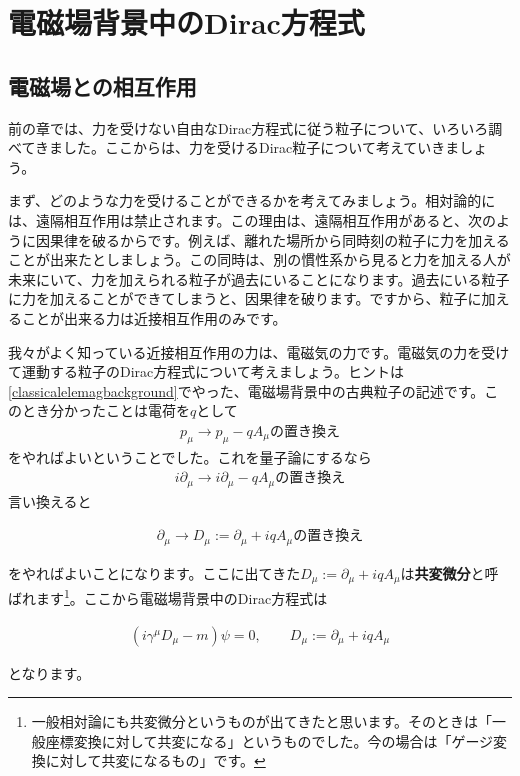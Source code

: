 \documentclass[report,paper=a4, fontsize=12pt, line_length=16cm, number_of_lines=33,dvipdfmx]{jlreq}
\newenvironment{important}{\begin{tcolorbox}[
  colback = white,
  colframe = red!35,
  boxrule = 2mm,
  fonttitle = \bfseries,
  after = \noindent] }{\end{tcolorbox}}
\numberwithin{equation}{chapter}
\newcommand{\del}{\partial}
\newcommand{\strong}[1]{{\sffamily \bfseries #1}}
\begin{document}
\chapter{電磁場背景中のDirac方程式}
\section{電磁場との相互作用}
前の章では、力を受けない自由なDirac方程式に従う粒子について、いろいろ調べてきました。ここからは、力を受けるDirac粒子について考えていきましょう。

まず、どのような力を受けることができるかを考えてみましょう。相対論的には、遠隔相互作用は禁止されます。この理由は、遠隔相互作用があると、次のように因果律を破るからです。例えば、離れた場所から同時刻の粒子に力を加えることが出来たとしましょう。この同時は、別の慣性系から見ると力を加える人が未来にいて、力を加えられる粒子が過去にいることになります。過去にいる粒子に力を加えることができてしまうと、因果律を破ります。ですから、粒子に加えることが出来る力は近接相互作用のみです。

我々がよく知っている近接相互作用の力は、電磁気の力です。電磁気の力を受けて運動する粒子のDirac方程式について考えましょう。ヒントは\ref{classicalelemagbackground}でやった、電磁場背景中の古典粒子の記述です。このとき分かったことは電荷を$q$として
\begin{align}
  p_{\mu}\rightarrow p_{\mu}-qA_{\mu}\text{の置き換え}
\end{align}
をやればよいということでした。これを量子論にするなら
\begin{align}
  i\del_{\mu}\rightarrow i\del_{\mu}-qA_{\mu}\text{の置き換え}
\end{align}
言い換えると
\begin{important}
  \begin{align}
    \del_{\mu}\rightarrow D_{\mu}:=\del_{\mu}+iqA_{\mu}\text{の置き換え}\label{covariantderivative}
  \end{align}
\end{important}
をやればよいことになります。ここに出てきた$D_{\mu}:=\del_{\mu}+iqA_{\mu}$は\strong{共変微分}と呼ばれます\footnote{一般相対論にも共変微分というものが出てきたと思います。そのときは「一般座標変換に対して共変になる」というものでした。今の場合は「ゲージ変換に対して共変になるもの」です。}。ここから電磁場背景中のDirac方程式は
\begin{important}
  \begin{align}
    (i\gamma^{\mu}D_{\mu}-m)\psi=0,\qquad D_{\mu}:=\del_{\mu}+iqA_{\mu}\label{Diraceqinelemag}
  \end{align}
\end{important}
となります。
\end{document}
